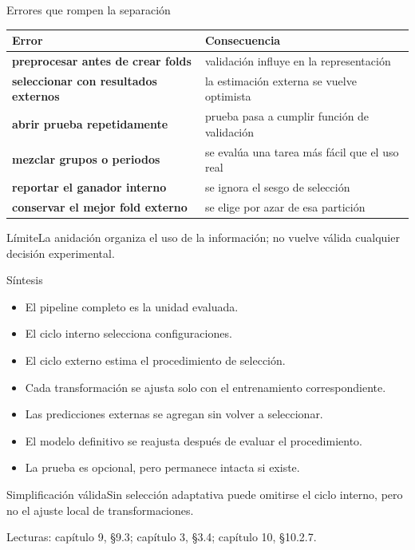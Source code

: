 \documentclass[aspectratio=169,10pt]{beamer}
\begin{document}
\begin{frame}{Errores que rompen la separación}
  \scriptsize
  \begin{tabularx}{\textwidth}{>{\bfseries}p{}X}\toprule
  Error & Consecuencia\\\midrule
  preprocesar antes de crear folds & validación influye en la representación\\
  seleccionar con resultados externos & la estimación externa se vuelve optimista\\
  abrir prueba repetidamente & prueba pasa a cumplir función de validación\\
  mezclar grupos o periodos & se evalúa una tarea más fácil que el uso real\\
  reportar el ganador interno & se ignora el sesgo de selección\\
  conservar el mejor fold externo & se elige por azar de esa partición\\\bottomrule
  \end{tabularx}
  \begin{alertblock}{Límite}La anidación organiza el uso de la información; no vuelve válida cualquier decisión experimental.\end{alertblock}
\end{frame}

\begin{frame}{Síntesis}
  \small
  \begin{itemize}
    \item El pipeline completo es la unidad evaluada.
    \item El ciclo interno selecciona configuraciones.
    \item El ciclo externo estima el procedimiento de selección.
    \item Cada transformación se ajusta solo con el entrenamiento correspondiente.
    \item Las predicciones externas se agregan sin volver a seleccionar.
    \item El modelo definitivo se reajusta después de evaluar el procedimiento.
    \item La prueba es opcional, pero permanece intacta si existe.
  \end{itemize}
  \begin{block}{Simplificación válida}Sin selección adaptativa puede omitirse el ciclo interno, pero no el ajuste local de transformaciones.\end{block}
  \scriptsize Lecturas: capítulo 9, §9.3; capítulo 3, §3.4; capítulo 10, §10.2.7.
\end{frame}
\end{document}
